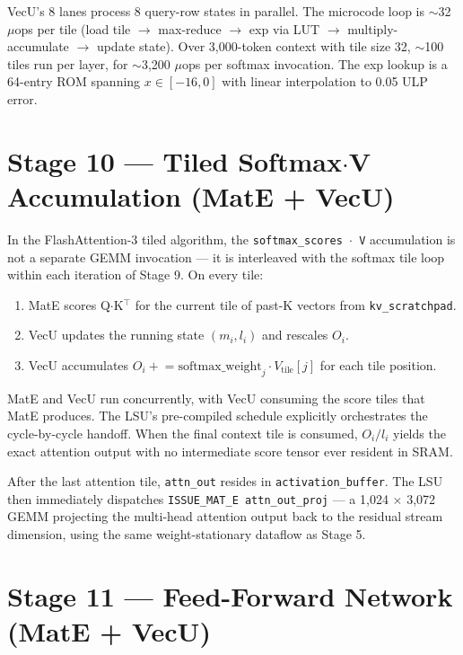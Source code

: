 \documentclass[11pt,letterpaper]{article}
\begin{document}
VecU's 8 lanes process 8 query-row states in parallel. The microcode loop is $\sim$32 $\mu$ops
per tile (load tile $\to$ max-reduce $\to$ exp via LUT $\to$ multiply-accumulate $\to$ update
state). Over 3{,}000-token context with tile size 32, $\sim$100 tiles run per layer, for
$\sim$3{,}200 $\mu$ops per softmax invocation. The exp lookup is a 64-entry ROM spanning
$x \in [-16, 0]$ with linear interpolation to 0.05 ULP error.

\section{Stage 10 --- Tiled Softmax$\cdot$V Accumulation (MatE + VecU)}

In the FlashAttention-3 tiled algorithm, the \texttt{softmax\_scores $\cdot$ V} accumulation
is not a separate GEMM invocation --- it is interleaved with the softmax tile loop within
each iteration of Stage 9. On every tile:

\begin{enumerate}[leftmargin=2em]
\item MatE scores Q$\cdot$K$^\top$ for the current tile of past-K vectors from \texttt{kv\_scratchpad}.
\item VecU updates the running state $(m_i, l_i)$ and rescales $O_i$.
\item VecU accumulates $O_i \mathrel{+}= \text{softmax\_weight}_j \cdot V_{\text{tile}}[j]$ for each tile position.
\end{enumerate}

MatE and VecU run concurrently, with VecU consuming the score tiles that MatE produces. The
LSU's pre-compiled schedule explicitly orchestrates the cycle-by-cycle handoff. When the
final context tile is consumed, $O_i / l_i$ yields the exact attention output with no
intermediate score tensor ever resident in SRAM.

After the last attention tile, \texttt{attn\_out} resides in \texttt{activation\_buffer}. The
LSU then immediately dispatches \texttt{ISSUE\_MAT\_E attn\_out\_proj} --- a 1{,}024 $\times$
3{,}072 GEMM projecting the multi-head attention output back to the residual stream
dimension, using the same weight-stationary dataflow as Stage 5.

\section{Stage 11 --- Feed-Forward Network (MatE + VecU)}
\end{document}
